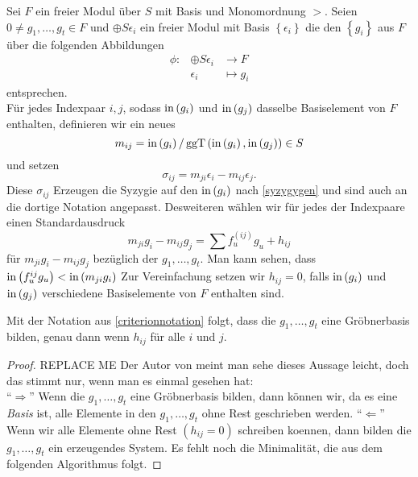 \documentclass{article}
\begin{document}
	\begin{nota}
		Sei 
		\( F \) 
		ein freier Modul \"uber
		\(S\)
		mit Basis und Monomordnung
		\( > \).
		Seien
		\( {0 \neq g_{1},\dots,g_{t} \in F} \)
		und 
		\( \oplus S \epsilon_{i} \)
		ein freier Modul mit Basis 
		\( \left\{ \epsilon_{i} \right\} \)
		die den 
		\( \left\{ g_{i} \right\}\)
		aus 
		\( F \)
		\"uber die folgenden Abbildungen 
		\begin{align*}
			\phi:& \oplus S \epsilon_{i} & \to F \\
			& \epsilon_{i} & \mapsto g_{i} 
		\end{align*}
		entsprechen. \\
		F\"ur jedes Indexpaar 
		\( i, j \),
		sodass 
		\( \operatorname{in} \left( g_{i} \right) \)
		und
		\( \operatorname{in} \left( g_{j} \right) \)
		dasselbe Basiselement von
		\( F \)
		enthalten,
		definieren wir ein neues
		\[
			m_{ij} 
			= \operatorname{in} \left( g_{i} \right) 
			/ \operatorname{ggT} \left( \operatorname{in}\left( g_{i} \right), 
			\operatorname{in} \left( g_{j} \right) \right) \in S
		\]
		und setzen
		\[
			\sigma_{ij} 
			= m_{ji} \epsilon_{i} 
			- m_{ij} \epsilon_{j}
		.\]
		Diese 
		\( \sigma_{ij} \)
		Erzeugen die Syzygie auf den 
		\( \operatorname{in} \left( g_{i} \right) \)
		nach \ref{syzygygen} und sind auch an die dortige Notation angepasst.
		Desweiteren w\"ahlen wir f\"ur jedes der Indexpaare einen Standardausdruck 
		\[ 
			m_{ji} g_{i} -m_{ij} g_{j} = \sum f_{u}^{\left( ij \right) } g_{u} + h_{ij}
		\]
		f\"ur 
		\(  m_{ji} g_{i} -m_{ij} g_{j} \)
		bez\"uglich der
		\( g_{1},\dots , g_{t} . \)
		Man kann sehen, 
		dass 
		\( \operatorname{in} \left( f_{u}^{ij} g_{u} \right) < \operatorname{in} \left( m_{ji}g_{i} \right) \)
		Zur Vereinfachung setzen wir
		\( h_{ij} = 0 \),
		falls 
		\( \operatorname{in}\left( g_{i} \right) \)
		und 
		\( \operatorname{in}\left( g_{j} \right) \)
		verschiedene Basiselemente von 
		\( F \)
		enthalten sind.
	\end{nota}
	\begin{thm}
		Mit der Notation aus \ref{criterionnotation} folgt,
		dass die 
		\( g_{1},\dots,g_{t} \)
		eine Gr\"obnerbasis bilden,
		genau dann wenn 
		\( h_{ij} \)
		f\"ur alle 
		\( i \)
		und 
		\( j\).
		\begin{proof}
			{\color{red} REPLACE ME }
			Der Autor von \cite{Eis1} 
			meint man sehe dieses Aussage leicht, 
			doch das stimmt nur,
			wenn man es einmal gesehen hat:\\
			``\( \Rightarrow \)'' Wenn die 
			\( g_{1},\dots,g_{t} \) 
			eine Gr\"obnerbasis bilden,
			dann k\"onnen wir, 
			da es eine \emph{Basis} ist,
			alle Elemente in den 
			\( g_{1},\dots,g_{t} \)
			ohne Rest geschrieben werden.
			``\(\Leftarrow \)'' Wenn wir alle Elemente ohne Rest
			\( \left( h_{ij} = 0 \right) \)
			schreiben koennen, 
			dann bilden die 
			\( g_{1},\dots,g_{t} \)
			ein erzeugendes System.
			Es fehlt noch die Minimalit\"at,
			die aus dem folgenden Algorithmus folgt.
		\end{proof}
	\end{thm}
\end{document}
